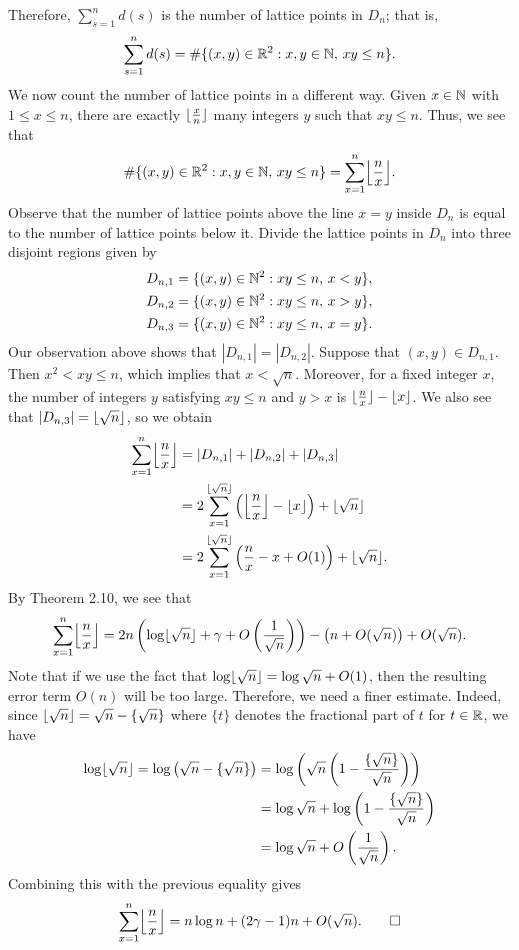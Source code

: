 \begin{pf}
Therefore, $\sum_{s=1}^n d(s)$ is the number of lattice points in $D_n$; that is, 
\[ \sum_{s=1}^n d(s) = \#\{(x, y) \in \mathbb{R}^2 : x, y \in \mathbb{N},\, xy \leq n\}. \]
We now count the number of lattice points in a different way. Given $x \in \mathbb{N}$ with $1 \leq x \leq n$, 
there are exactly $\lfloor\frac xn\rfloor$ many integers $y$ such that $xy \leq n$. Thus, we see that 
\[ \#\{(x, y) \in \R^2 : x, y \in \N,\, xy \leq n\} = \sum_{x=1}^n \floor*{\frac nx}. \]
Observe that the number of lattice points above the line $x = y$ inside $D_n$ is equal to the number of 
lattice points below it. Divide the lattice points in $D_n$ into three disjoint regions given by 
\begin{align*}
    D_{n,1} &= \{(x, y) \in \mathbb{N}^2 : xy \leq n,\, x < y\}, \\ 
    D_{n,2} &= \{(x, y) \in \mathbb{N}^2 : xy \leq n,\, x > y\}, \\
    D_{n,3} &= \{(x, y) \in \mathbb{N}^2 : xy \leq n,\, x = y\}.
\end{align*}
Our observation above shows that $|D_{n,1}| = |D_{n,2}|$. Suppose that $(x, y) \in D_{n,1}$. Then 
$x^2 < xy \leq n$, which implies that $x < \sqrt n$. Moreover, for a fixed integer $x$, the number of 
integers $y$ satisfying $xy \leq n$ and $y > x$ is $\lfloor\frac nx\rfloor - \lfloor x\rfloor$. We also see that 
$|D_{n,3}| = \lfloor\sqrt n\rfloor$, so we obtain 
\begin{align*}
    \sum_{x=1}^n \floor*{\frac nx} &= |D_{n,1}| + |D_{n,2}| + |D_{n,3}| \\
    &= 2 \sum_{x=1}^{\floor{\sqrt n}} \left( \floor*{\frac nx} - \floor x \right) + \floor{\sqrt n} \\
    &= 2 \sum_{x=1}^{\floor{\sqrt n}} \left( \frac nx - x + O(1) \right) + \floor{\sqrt n}. 
\end{align*}
By Theorem 2.10, we see that 
\[ \sum_{x=1}^n \floor*{\frac nx} = 2n \left( \log\floor{\sqrt n} + \gamma + O\left( \frac1{\sqrt n} \right) \right) - \left( n + O(\sqrt n) \right) + O(\sqrt n). \]
Note that if we use the fact that $\log\lfloor\sqrt n\rfloor = \log \sqrt n + O(1)$, then the resulting 
error term $O(n)$ will be too large. Therefore, we need a finer estimate. Indeed, since 
$\lfloor\sqrt n\rfloor = \sqrt n - \{\sqrt n\}$ where $\{t\}$ denotes the fractional part of $t$ for 
$t \in \mathbb{R}$, we have 
\begin{align*} \log \lfloor\sqrt n\rfloor = \log \left( \sqrt n - \{\sqrt n\} \right) 
&= \log \left( \sqrt n \left( 1 - \frac{\{\sqrt n\}}{\sqrt n} \right) \right) \\
&= \log \sqrt n + \log \left( 1 - \frac{\{\sqrt n\}}{\sqrt n} \right) \\
&= \log \sqrt n + O\left( \frac1{\sqrt n} \right). \end{align*}
Combining this with the previous equality gives 
\[ \sum_{x=1}^n \floor*{\frac nx} = n\log n + (2\gamma - 1)n + O(\sqrt n). \qedhere \]
\end{pf}